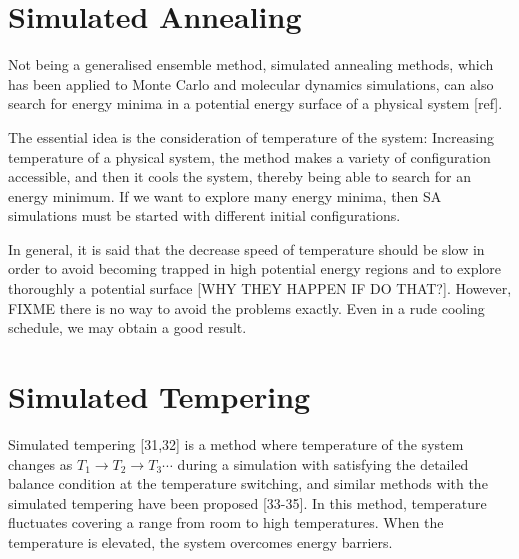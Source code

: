 \section{Simulated Annealing}
Not being a generalised ensemble method, simulated annealing methods, which has been applied to Monte Carlo and molecular dynamics simulations, can also search for energy minima in a potential energy surface of a physical system [ref]. 

The essential idea is the consideration of temperature of the system:
Increasing temperature of a physical system, the method makes a variety of configuration  accessible, and then it cools the system, thereby being able to search for an energy minimum. If we want to explore many energy minima, then SA simulations must be started with different initial configurations.

In general, it is said that the decrease speed of temperature should be slow in order to avoid becoming trapped in high potential energy regions and to explore thoroughly a potential surface {\color{red} [WHY THEY HAPPEN IF DO THAT?]}. However, {\color {red} FIXME there is no way to avoid the problems exactly.} Even in a rude cooling schedule, we may obtain a good result.

\section{Simulated Tempering}
Simulated tempering [31,32] is a method where temperature of the system changes as $T_1 \rightarrow T_2 \rightarrow T_3 \cdots$ during a simulation with satisfying the detailed balance condition at the temperature switching, and similar methods with the simulated tempering have been proposed [33-35]. In this method, temperature fluctuates covering a range from room to high temperatures. When the temperature is elevated, the system overcomes energy barriers. 

